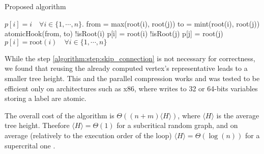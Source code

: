 \begin{algorithm}%
    \caption{Proposed algorithm}
    \label{algorithm:cc2}
    \begin{algorithmic}[1]
        \State $p[i] = i \quad \forall i \in \{1,\cdots, n\}$. %
         
                \State from = max(root(i), root(j))
                \State to = mint(root(i), root(j))
                \State  atomicHook(from, to)
        \EndWhile
        \State  \kif !isRoot(i) \kthen p[i] = root(i) \label{algorithm:step:skip_connection}
        \State  \kif !isRoot(j) \kthen p[j] = root(j)
        \EndFor
        \State $p[i] = \text{root}(i) \quad \forall i \in \{1,\cdots, n\}$ 
        \EndProcedure
    \end{algorithmic}
\end{algorithm}

While the step \ref{algorithm:step:skip_connection} is not necessary for correctness, we found that
reusing the already computed vertex's representative leads to a smaller tree height. This and the parallel compression works and was tested to
be efficient only on architectures such as x86, where writes to 32 or 64-bits variables storing a label are atomic.

The overall cost of the algorithm is $\Theta((n + m)\langle H \rangle)$, where $\langle H \rangle$ is
the average tree height. Theefore $\langle H \rangle = \Theta(1)$ for a subcritical random graph, and on average (relatively to the execution order of the loop) $\langle H \rangle = \Theta(\log(n))$
for a supercrital one \cite{RandomGraph}.



